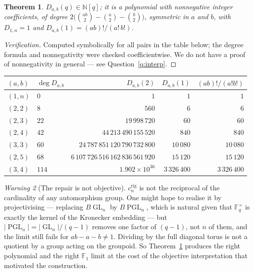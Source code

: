 \documentclass[11pt,a4paper]{article}
\newtheorem{theorem}{Theorem}[section]
\theoremstyle{definition}
\theoremstyle{remark}
\newtheorem{warning}[theorem]{Warning}
\newcommand{\FF}{\mathbb{F}}
\newcommand{\NN}{\mathbb{N}}
\DeclareMathOperator{\GL}{GL}
\DeclareMathOperator{\PGL}{PGL}
\newcommand{\norm}[1]{\lvert #1 \rvert}
\begin{document}
\begin{theorem}\label{thm:D}
$D_{a,b}(q) \in \NN[q]$; it is a polynomial with nonnegative integer coefficients, of
degree $2\bigl(\binom{ab}2 - \binom a2 - \binom b2\bigr)$, symmetric in $a$ and $b$, with
$D_{1,n} = 1$ and $D_{a,b}(1) = (ab)!/(a!\,b!)$.
\end{theorem}

\begin{proof}[Verification]
Computed symbolically for all pairs in the table below; the degree formula and
nonnegativity were checked coefficientwise. We do not have a proof of nonnegativity in
general --- see Question~\ref{q:interp}.
\end{proof}

\begin{center}
\small
\begin{tabular}{@{}llrrr@{}}
\toprule
$(a,b)$ & $\deg D_{a,b}$ & $D_{a,b}(2)$ & $D_{a,b}(1)$ & $(ab)!/(a!b!)$ \\
\midrule
$(1,n)$ & $0$  & $1$ & $1$ & $1$ \\
$(2,2)$ & $8$  & $560$ & $6$ & $6$ \\
$(2,3)$ & $22$ & $19\,998\,720$ & $60$ & $60$ \\
$(2,4)$ & $42$ & $44\,213\,490\,155\,520$ & $840$ & $840$ \\
$(3,3)$ & $60$ & $24\,787\,851\,120\,790\,732\,800$ & $10\,080$ & $10\,080$ \\
$(2,5)$ & $68$ & $6\,107\,726\,516\,162\,836\,561\,920$ & $15\,120$ & $15\,120$ \\
$(3,4)$ & $114$ & $1.902\times10^{36}$ & $3\,326\,400$ & $3\,326\,400$ \\
\bottomrule
\end{tabular}
\end{center}

\begin{warning}[The repair is not objective]
$c^{\mathrm{rig}}_n$ is not the reciprocal of the cardinality of any automorphism group.
One might hope to realise it by projectivising --- replacing $B\GL_n$ by $B\PGL_n$, which
is natural given that $\FF_q^\times$ is exactly the kernel of the Kronecker embedding ---
but $\norm{\PGL_n} = \norm{\GL_n}/(q-1)$ removes one factor of $(q-1)$, not $n$ of them,
and the limit still fails for $ab - a - b \neq 1$. Dividing by the full diagonal torus is
not a quotient by a group acting on the groupoid. So
Theorem~\ref{thm:D} produces the right polynomial and the right $\FF_1$ limit at the cost
of the objective interpretation that motivated the construction.
\end{warning}
\end{document}

